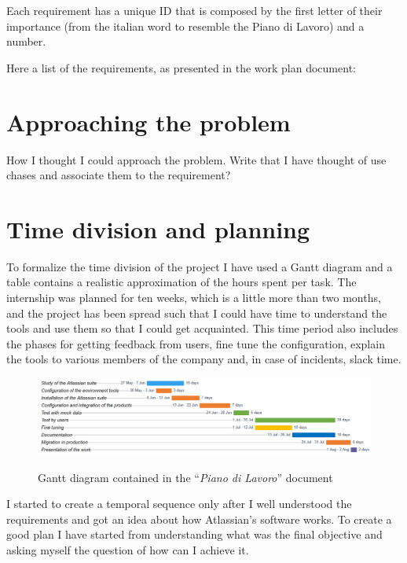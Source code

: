 	Each requirement has a unique ID that is composed by the first letter of their importance (from the italian word to resemble the Piano di Lavoro) and a number.

	Here a list of the requirements, as presented in the work plan document:


\section{Approaching the problem}

	How I thought I could approach the problem.
	Write that I have thought of use chases and associate them to the requirement?

\section{Time division and planning}

	To formalize the time division of the project I have used a Gantt diagram and a table contains a realistic approximation of the hours spent per task.
	The internship was planned for ten weeks, which is a little more than two months, and the project has been spread such that I could have time to understand the tools and use them so that I could get acquainted.
	This time period also includes the phases for getting feedback from users, fine tune the configuration, explain the tools to various members of the company and, in case of incidents, slack time.
	\begin{figure}[H]
		\centering
		\includegraphics[width=1.1\textwidth]{resources/work_plan_gantt}\\
		\caption{Gantt diagram contained in the ``\textit{Piano di Lavoro}'' document}
	\end{figure}
	I started to create a temporal sequence only after I well understood the requirements and got an idea about how Atlassian's software works.
	To create a good plan I have started from understanding what was the final objective and asking myself the question of how can I achieve it.
	
	
